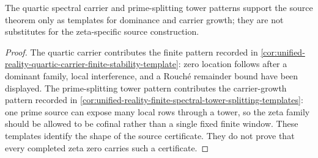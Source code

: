\begin{corollary}
\label{cor:unified-reality-finite-templates-are-source-templates}
The quartic spectral carrier and prime-splitting tower patterns support
the source theorem only as templates for dominance and carrier growth;
they are not substitutes for the zeta-specific source construction.
\end{corollary}

\begin{proof}
The quartic carrier contributes the finite pattern recorded in
\autoref{cor:unified-reality-quartic-carrier-finite-stability-template}:
zero location follows after a dominant family, local interference, and a
Rouch\'e remainder bound have been displayed.  The prime-splitting tower
pattern contributes the carrier-growth pattern recorded in
\autoref{cor:unified-reality-finite-spectral-tower-splitting-templates}:
one prime source can expose many local rows through a tower, so the zeta
family should be allowed to be cofinal rather than a single fixed finite
window.  These templates identify the shape of the source certificate.
They do not prove that every completed zeta zero carries such a
certificate.
\end{proof}
